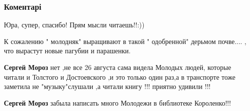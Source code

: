  
 
 
 
 
\subsubsection{Коментарі}
\label{sec:29_08_2021.fb.molchanov_jurij.1.pokazuha.cmt}

\begin{itemize}
 
Юра, супер, спасибо! Прям мысли читаешь!!:))

 
К сожалению " молодняк" выращивают в такой " одобренной" дерьмом почве.... , что вырастут новые пагубии и парашенки.

\begin{itemize}
 
\textbf{Сергей Мороз} нет ,не все 26 августа сама видела Молодых людей, которые читали и Толстого и Достоевского ,и это только один раз,а в транспорте тоже заметила не "музыку"слушали ,а читали книгу !!! приятно удивили !!!

 
\textbf{Сергей Мороз} забыла написать много Молодежи в библиотеке Короленко!!!


\end{itemize}
\end{itemize}
